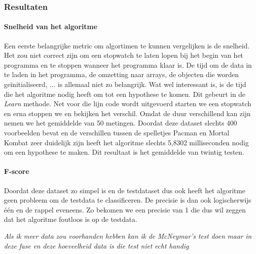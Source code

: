 \subsubsection{Resultaten}
\paragraph{Snelheid van het algoritme} 
Een eerste belangrijke metric om algortimen te kunnen vergelijken is de snelheid. Het zou niet correct zijn om een stopwatch te laten lopen bij het begin van het programma en te stoppen wanneer het programma klaar is. De tijd om de data in te laden in het programma, de omzetting naar arrays, de objecten die worden geïnitialiseerd, ... is allemaal niet zo belangrijk. Wat wel interessant is, is de tijd die het algoritme nodig heeft om tot een hypothese te komen. Dit gebeurt in de \textit{Learn} methode. 
Net voor die lijn code wordt uitgevoerd starten we een stopwatch en erna stoppen we en bekijken het verschil. Omdat de duur verschillend kan zijn nemen we het gemiddelde van 50 metingen. 
Doordat deze dataset slechts 400 voorbeelden bevat en de verschillen tussen de spelletjes Pacman en Mortal Kombat zeer duidelijk zijn heeft het algoritme slechts 5,8302 milliseconden nodig om een hypothese te maken. Dit resultaat is het gemiddelde van twintig testen. 
\paragraph{F-score} 

Doordat deze dataset zo simpel is en de testdataset dus ook heeft het algoritme geen probleem om de testdata te classificeren. De precisie is dan ook logischerwijs één en de rappel eveneens.
Zo bekomen we een precisie van 1 die dus wil zeggen dat het algoritme foutloos is op de testdata.  


\textit{Als ik meer data zou voorhanden hebben kan ik de McNeymar's test doen maar in deze fase en deze hoeveelheid data is die test niet echt handig}

